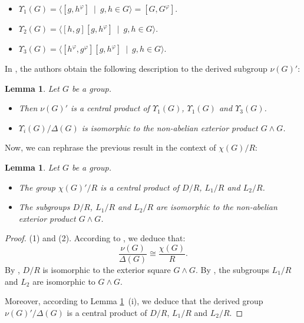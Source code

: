\documentclass[12pt,leqno]{amsart}
\newtheorem{lem}[theorem]{\sc Lemma}
\begin{document}
\begin{itemize}
    \item $\Upsilon_1(G) = \langle [g,h^{\varphi}] \ \mid \ g,h \in G \rangle = [G,G^{\varphi}]$.
    \item $\Upsilon_2(G) = \langle [h,g][g,h^{\varphi}] \ \mid \ g,h \in G \rangle$.
    \item $\Upsilon_3(G) = \langle [h^{\varphi},g^{\varphi}] [g,h^{\varphi}] \ \mid \ g,h \in G \rangle$.
\end{itemize}

In \cite{BdOMR}, the authors obtain the following description to the derived subgroup $\nu(G)'$: 

\begin{lem}\cite[Theorem A]{BdOMR} \label{lem:upsilon}
Let $G$ be a group. 
\begin{itemize}
    \item[(i)] Then $\nu(G)'$ is a central product of $\Upsilon_1(G)$, $\Upsilon_1(G)$ and $\Upsilon_3(G)$. 
    \item[(ii)] $\Upsilon_i(G)/\Delta(G)$ is isomorphic to the non-abelian exterior product $G\wedge G$. 
\end{itemize}
\end{lem}

Now, we can rephrase the previous result in the context of $\chi(G)/R$: 

\begin{lem} \label{lem:exterior}
Let $G$ be a group. 
\begin{itemize}
    \item[(i)] The group $\chi(G)'/R$ is a central product of $D/R$, $L_1/R$ and $L_2/R$. 
    \item[(ii)] The subgroups $D/R$, $L_1/R$ and $L_2/R$ are isomorphic to the non-abelian exterior product $G \wedge G$.
\end{itemize}
\end{lem}
\begin{proof}
(1) and (2). According to \cite[Theorem 2.1~(ii)]{NR2}, we deduce that: 
\[ 
\dfrac{\nu(G)}{\Delta(G)} \cong \dfrac{\chi(G)}{R}.
\]    
By \cite[Section 2]{NR2}, $D/R$ is isomorphic to the exterior square $G \wedge G$. By \cite[Theorem A~(a)]{BdOMR}, the subgroups $L_1/R$ and $L_2$ are isomorphic to $G \wedge G$.     

Moreover, according to Lemma \ref{lem:upsilon}~(i), we deduce that the derived group $\nu(G)'/\Delta(G)$ is a central product of $D/R$, $L_1/R$ and $L_2/R$. 
\end{proof}
\end{document}
